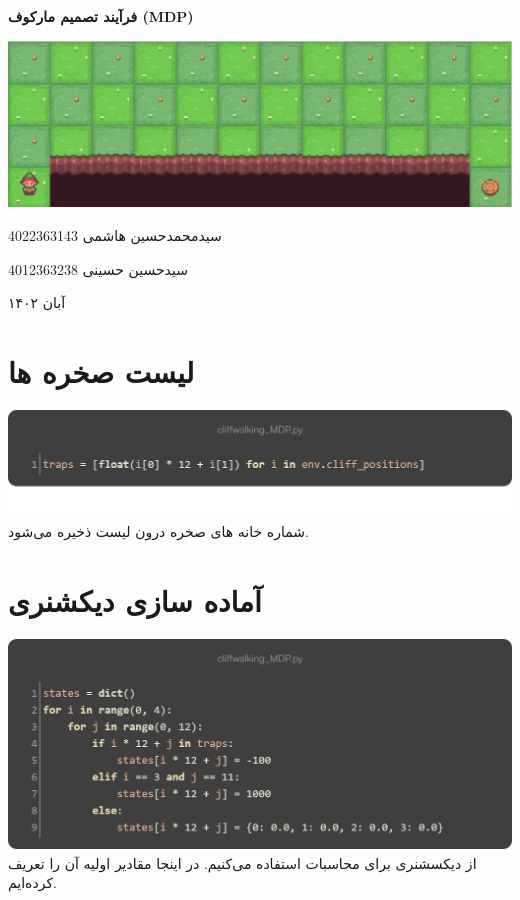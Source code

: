 \documentclass[12pt, dvipsnames, svgnames, x11names,]{article}
\begin{document}
	\begin{titlepage}
		\centering
		\vspace{1cm}
		{\Huge {\textbf{فرآیند تصمیم مارکوف (MDP)}}\par}
		\vspace{15mm}
		\vspace{16mm}
		\includegraphics[width=14cm]{images/cliff_walking} \par
		\vfill \par	\vfill
		\vspace{16mm}
		{\normalsize	سیدمحمدحسین هاشمی  4022363143 \par}
		
		{\normalsize	سیدحسین حسینی  4012363238 \par}
		\vspace{1cm}
		{\large آبان ۱۴۰۲\par}
	\end{titlepage}
	\tableofcontents
	\newpage
	
	
	\section{لیست صخره ها}
	
		{\includegraphics[width=14cm]{images/01}}
		{\normalsize شماره خانه های صخره درون لیست  ذخیره می‌شود.}
		
	\section{آماده سازی دیکشنری }
	
		{\includegraphics[width=14cm]{images/02}}
		{\normalsize از دیکسشنری  برای محاسبات استفاده می‌کنیم.}
		{\normalsize در اینجا مقادیر اولیه آن را تعریف کرده‌ایم.}
	
\end{document}
